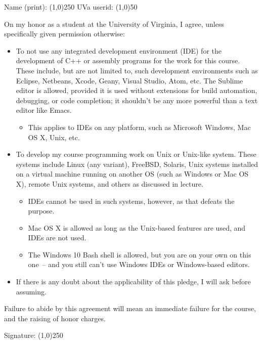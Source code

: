 \documentclass{article}
\begin{document}
\large

\noindent Name (print): \line(1,0){250} \hspace{0.25in} UVa userid:
\line(1,0){50}

\vspace{0.5in}


\vspace{0.5in}

\noindent On my honor as a student at the University of Virginia, I
agree, unless specifically given permission otherwise:

\begin{itemize}

\item To not use any integrated development environment (IDE) for the
  development of C++ or assembly programs for the work for this
  course. These include, but are not limited to, such development
  environments such as Eclipse, Netbeans, Xcode, Geany, Visual Studio,
  Atom, etc.  The Sublime editor is allowed, provided it is used
  without extensions for build automation, debugging, or code
  completion; it shouldn't be any more powerful than a text editor
  like Emacs.
\begin{itemize}

\item This applies to IDEs on any platform, such as Microsoft Windows,
  Mac OS X, Unix, etc.

\end{itemize}

\item To develop my course programming work on Unix or Unix-like
  system. These systems include Linux (any variant), FreeBSD, Solaris,
  Unix systems installed on a virtual machine running on another OS
  (such as Windows or Mac OS X), remote Unix systems, and others as
  discussed in lecture.

\begin{itemize}

\item IDEs cannot be used in such systems, however, as that defeats
  the purpose.

\item Mac OS X is allowed as long as the Unix-based features are used,
  and IDEs are not used.

\item The Windows 10 Bash shell is allowed, but you are on your own on
  this one~-- and you still can't use Windows IDEs or Windows-based
  editors.

\end{itemize}

\item If there is any doubt about the applicability of this pledge, I
  will ask before assuming.

\end{itemize}

\vspace{0.25in}

\noindent Failure to abide by this agreement will mean an immediate
failure for the course, and the raising of honor charges.

\vspace{0.5in}

\noindent Signature: \line(1,0){250}
\end{document}
